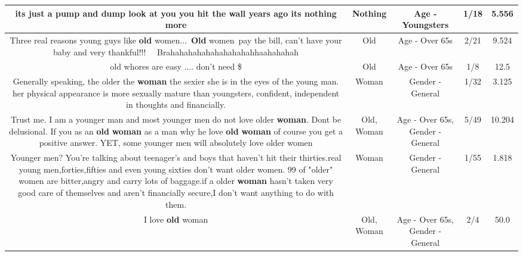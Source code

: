 \documentclass[11pt]{article}
\newlength\mylength
\begin{document}
\begin{center}
\begin{longtable}{|C{.65\mylength}|C{.30\mylength}|C{.12\mylength}|C{.12\mylength}|C{.12\mylength}|}
  \small its just a pump and dump look at you you hit the wall years ago its \textbf{nothing} more\normalsize   & Nothing & Age - Youngsters & 1/18 & 5.556 \\  \hline
  \small Three real reasons young guys like \textbf{old} women... \textbf{Old} women pay the bill, can't have your baby and very thankful!!!   Brahahahahahahahahahahhaahahahah\normalsize   & Old & Age - Over 65s & 2/21 & 9.524 \\  \hline
  \small old whores are easy .... don't need \$\normalsize   & Old & Age - Over 65s & 1/8 & 12.5 \\  \hline
  \small Generally speaking, the older the \textbf{woman} the sexier she is in the eyes of the young man. her physical appearance is more sexually mature than youngsters, confident, independent in thoughts and financially.\normalsize   & Woman & Gender - General & 1/32 & 3.125 \\  \hline
  \small Trust me. I am a younger man and most younger men do not love older \textbf{woman}. Dont be delusional. If you as an \textbf{old} \textbf{woman} as a man why he love \textbf{old} \textbf{woman} of course you get a positive answer. YET, some younger men will absolutely love older women\normalsize   & Old, Woman & Age - Over 65s, Gender - General & 5/49 & 10.204 \\  \hline
  \small Younger men? You're talking about teenager's and boys that haven't hit their thirties.real young men,forties,fifties and even young sixties don't want older women. 99 of "older" women are bitter,angry and carry lots of baggage.if a older \textbf{woman} hasn't taken very good care of themselves and aren't financially secure,I don't want anything to do with  them.\normalsize   & Woman & Gender - General & 1/55 & 1.818 \\  \hline
  \small I love \textbf{old} woman\normalsize   & Old, Woman & Age - Over 65s, Gender - General & 2/4 & 50.0 \\  \hline

\end{longtable}
\end{center}
\end{document}
